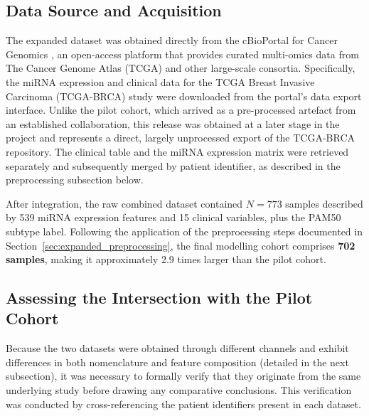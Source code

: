 \subsection*{Data Source and Acquisition}

The expanded dataset was obtained directly from the cBioPortal for Cancer Genomics
\cite{cerami2012cbio, TCGA2012}, an open-access platform that provides curated
multi-omics data from The Cancer Genome Atlas (TCGA) \cite{TCGA_BRCA} and other large-scale consortia.
Specifically, the miRNA expression and clinical data for the TCGA Breast Invasive
Carcinoma (TCGA-BRCA) study were downloaded from the portal's data export interface.
Unlike the pilot cohort, which arrived as a pre-processed artefact from an established
collaboration, this release was obtained at a later stage in the project and represents a
direct, largely unprocessed export of the TCGA-BRCA repository. The clinical table and
the miRNA expression matrix were retrieved separately and subsequently merged by
patient identifier, as described in the preprocessing subsection below.
 
After integration, the raw combined dataset contained $N = 773$ samples described
by 539 miRNA expression features and 15 clinical variables, plus the PAM50 subtype
label. Following the application of the preprocessing steps documented in
Section~\ref{sec:expanded_preprocessing}, the final modelling cohort comprises
\textbf{702 samples}, making it approximately 2.9 times larger than the pilot cohort.

\subsection*{Assessing the Intersection with the Pilot Cohort}

Because the two datasets were obtained through different channels and exhibit
differences in both nomenclature and feature composition (detailed in the next
subsection), it was necessary to formally verify that they originate from the same
underlying study before drawing any comparative conclusions. This verification was
conducted by cross-referencing the patient identifiers present in each dataset.

